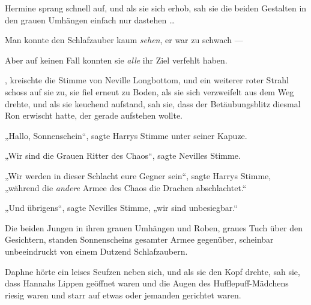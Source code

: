 Hermine sprang schnell auf, und als sie sich erhob, sah sie die beiden Gestalten in den grauen Umhängen einfach nur dastehen …

Man konnte den Schlafzauber kaum \emph{sehen}, er war zu schwach —

Aber auf keinen Fall konnten sie \emph{alle} ihr Ziel verfehlt haben.

, kreischte die Stimme von Neville Longbottom, und ein weiterer roter Strahl schoss auf sie zu, sie fiel erneut zu Boden, als sie sich verzweifelt aus dem Weg drehte, und als sie keuchend aufstand, sah sie, dass der Betäubungsblitz diesmal Ron erwischt hatte, der gerade aufstehen wollte.

„Hallo, Sonnenschein“, sagte Harrys Stimme unter seiner Kapuze.

„Wir sind die Grauen Ritter des Chaos“, sagte Nevilles Stimme.

„Wir werden in dieser Schlacht eure Gegner sein“, sagte Harrys Stimme, „während die \emph{andere} Armee des Chaos die Drachen abschlachtet.“

„Und übrigens“, sagte Nevilles Stimme, „wir sind unbesiegbar.“

\later

Die beiden Jungen in ihren grauen Umhängen und Roben, graues Tuch über den Gesichtern, standen Sonnenscheins gesamter Armee gegenüber, scheinbar unbeeindruckt von einem Dutzend Schlafzaubern.

Daphne hörte ein leises Seufzen neben sich, und als sie den Kopf drehte, sah sie, dass Hannahs Lippen geöffnet waren und die Augen des Hufflepuff-Mädchens riesig waren und starr auf etwas oder jemanden gerichtet waren.


